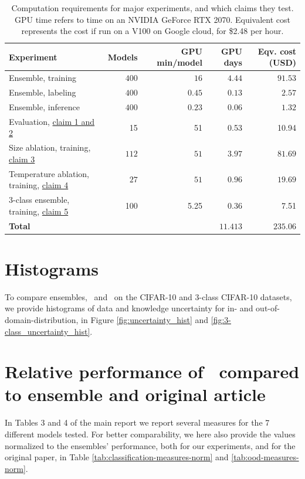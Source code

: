 \begin{table}[]
    \centering
     \caption{Computation requirements for major experiments, and which claims they test. GPU time refers to time on an NVIDIA GeForce RTX 2070. Equivalent cost represents the cost if run on a V100 on Google cloud, for \$2.48 per hour. }
    \begin{tabular}{l || r | r | r| r}
         \textbf{Experiment} & \textbf{Models} & \textbf{GPU min/model}  & \textbf{GPU days} & \textbf{Eqv. cost (USD)}  \\
         \hline
         \hline
         Ensemble, training & $400$ & $16$ & $4.44$ & $91.53$\\
         Ensemble, labeling & $400$& $0.45$ & $0.13$ & $2.57$\\
         Ensemble, inference & $400$& $0.23$ & $0.06$ & $1.32$ \\
         \hline 
         Evaluation, \hyperlink{claim1}{claim 1 and 2} & 15 & 51 & 0.53 & 10.94 \\
         \hline
         Size ablation, training, \hyperlink{claim3}{claim 3} & $112$ & $51$ & $3.97$ & $81.69$ \\
         Temperature ablation, training, \hyperlink{claim4}{claim 4} & $27$ & $51$ & $0.96$& $19.69$\\
         \hline
         3-class ensemble, training, \hyperlink{claim 5}{claim 5} &100 &5.25 &0.36 &7.51 \\
         \hline
         \hline
         \textbf{Total} & & & $11.413$ & $235.06$
    \end{tabular}
   
    \label{tab:comp}
\end{table}


\section{Histograms}
To compare ensembles, \EnDD \ and \EnDDaux \ on the CIFAR-10 and 3-class CIFAR-10 datasets, we provide histograms of data and knowledge uncertainty for in- and out-of-domain-distribution, in Figure \ref{fig:uncertainty_hist} and \ref{fig:3-class_uncertainty_hist}. 


\section{Relative performance of \EnDD \ compared to ensemble and original article}

In Tables 3 and 4 of the main report we report several measures for the 7 different models tested. For better comparability, we here also provide the values normalized to the ensembles' performance, both for our experiments, and for the original paper, in Table \ref{tab:classification-measures-norm} and \ref{tab:ood-measures-norm}. 




